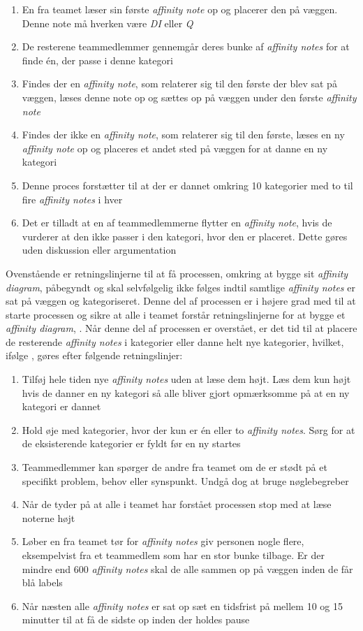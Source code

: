 %
\begin{enumerate}
  \item En fra teamet læser sin første \textit{affinity note} op og placerer den på væggen. Denne note må hverken være \textit{DI} eller \textit{Q}
  \item De resterene teammedlemmer gennemgår deres bunke af \textit{affinity notes} for at finde én, der passe i denne kategori
  \item Findes der en \textit{affinity note}, som relaterer sig til den første der blev sat på væggen, læses denne note op og sættes op på væggen under den første \textit{affinity note}
  \item Findes der ikke en \textit{affinity note}, som relaterer sig til den første, læses en ny \textit{affinity note} op og placeres et andet sted på væggen for at danne en ny kategori
  \item Denne proces forstætter til at der er dannet omkring 10 kategorier med to til fire \textit{affinity notes} i hver
  \item Det er tilladt at en af teammedlemmerne flytter en \textit{affinity note}, hvis de vurderer at den ikke passer i den kategori, hvor den er placeret. Dette gøres uden diskussion eller argumentation\blankline 
\end{enumerate}
%
Ovenstående er retningslinjerne til at få processen, omkring at bygge sit \textit{affinity diagram}, påbegyndt og skal selvfølgelig ikke følges indtil samtlige \textit{affinity notes} er sat på væggen og kategoriseret. Denne del af processen er i højere grad med til at starte processen og sikre at alle i teamet forstår retningslinjerne for at bygge et \textit{affinity diagram}, \parencite[s. 168]{Book:BuildingAnAffinity}. Når denne del af processen er overstået, er det tid til at placere de resterende \textit{affinity notes} i kategorier eller danne helt nye kategorier, hvilket, ifølge \textcite[ss. 168-169]{Book:BuildingAnAffinity}, gøres efter følgende retningslinjer:\blankline
%
\begin{enumerate}
  \item Tilføj hele tiden nye \textit{affinity notes} uden at læse dem højt. Læs dem kun højt hvis de danner en ny kategori så alle bliver gjort opmærksomme på at en ny kategori er dannet
  \item Hold øje med kategorier, hvor der kun er én eller to \textit{affinity notes}. Sørg for at de eksisterende kategorier er fyldt før en ny startes
  \item Teammedlemmer kan spørger de andre fra teamet om de er stødt på et specifikt problem, behov eller synspunkt. Undgå dog at bruge nøglebegreber
  \item Når de tyder på at alle i teamet har forstået processen stop med at læse noterne højt
  \item Løber en fra teamet tør for \textit{affinity notes} giv personen nogle flere, eksempelvist fra et teammedlem som har en stor bunke tilbage. Er der mindre end 600 \textit{affinity notes} skal de alle sammen op på væggen inden de får blå labels
  \item Når næsten alle \textit{affinity notes} er sat op sæt en tidsfrist på mellem 10 og 15 minutter til at få de sidste op inden der holdes pause\blankline
\end{enumerate}
